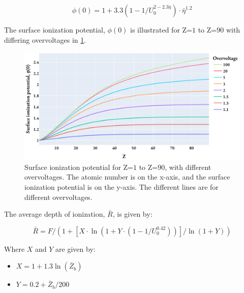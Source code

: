 \begin{equation}
    \label{eq:theory:quantitative:pap:phi_0}
    \phi(0) = 1 + 3.3 (1-1/U_0^{2 - 2.3 \bar{\eta}}) \cdot \bar{\eta}^{1.2}
\end{equation}


The surface ionization potential, $\phi(0)$ is illustrated for Z=$1$ to Z=$90$ with differing overvoltages in \cref{fig:pap:phi_0}.


\begin{figure}[htbp]
    \centering
    \includegraphics[width=0.8\linewidth]{figures/PAP_surface_ionization_potential.pdf}
    \caption{
        Surface ionization potential for Z=$1$ to Z=$90$, with different overvoltages.
        The atomic number is on the x-axis, and the surface ionization potential is on the y-axis.
        The different lines are for different overvoltages.
    }
    \label{fig:pap:phi_0}
\end{figure}

The average depth of ionization, $\bar{R}$, is given by:

\begin{equation}
    \label{eq:theory:quantitative:pap:R_bar}
    \bar{R} = F / (1 + [X \cdot \ln(1 + Y \cdot (1 - 1/U_0^{0.42}))]/\ln(1 + Y))
\end{equation}

Where $X$ and $Y$ are given by:

\begin{itemize}
    \item $ X = 1 + 1.3 \ln(\bar{Z}_b) $
    \item $ Y = 0.2 + \bar{Z}_b/200 $
\end{itemize}




